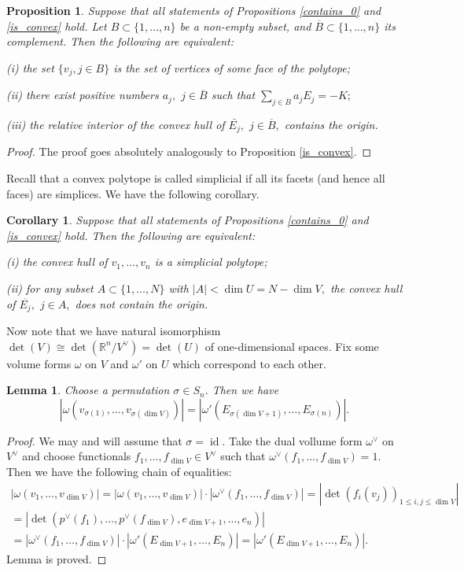 \documentclass[11pt,leqno]{amsart}
\newtheorem{lemma}[theo]{Lemma}
\newtheorem{prop}[theo]{Proposition}
\newtheorem{cor}[theo]{Corollary}
\numberwithin{equation}{section}
\def\R{\mathbb{R}}
\newcommand{\id}{\operatorname{id}}
\begin{document}
\begin{prop}\label{compl_to_faces}Suppose that all statements of Propositions \ref{contains_0} and \ref{is_convex} hold. Let $B\subset \{1,\dots,n\}$ be a non-empty subset, and $\overline{B}\subset \{1,\dots,n\}$
its complement. Then the following are equivalent:

(i) the set $\{v_j,j\in B\}$ is the set of vertices of some face of the polytope;

(ii) there exist positive numbers $a_j,$ $j\in\overline{B}$ such that
$\sum\limits_{j\in\overline{B}}a_jE_j=-K;$

(iii) the relative interior of the convex hull of $\bar{E_j},$ $j\in\overline{B},$ contains the origin.\end{prop}

\begin{proof}The proof goes absolutely analogously to Proposition \ref{is_convex}.\end{proof}

Recall that a convex polytope is called simplicial if all its facets (and hence all faces) are simplices. We have the following corollary.

\begin{cor}Suppose that all statements of Propositions \ref{contains_0} and \ref{is_convex} hold. Then the following are equivalent:

(i) the convex hull of $v_1,\dots,v_n$ is a simplicial polytope;

(ii) for any subset $A\subset \{1,\dots,N\}$ with $|A|<\dim U=N-\dim V,$ the convex hull of $\overline{E_j},$ $j\in A,$
does not contain the origin.\end{cor}

Now note that we have natural isomorphism $\det(V)\cong \det(\R^n/V^{\vee})=\det(U)$ of one-dimensional spaces. Fix some
volume forms $\omega$ on $V$ and $\omega'$ on $U$ which correspond to each other.

\begin{lemma}\label{volumes}Choose a permutation $\sigma\in S_n.$ Then we have
$$|\omega(v_{\sigma(1)},\dots,v_{\sigma(\dim V)})|=|\omega'(E_{\sigma(\dim V+1)},\dots,E_{\sigma(n)})|.$$\end{lemma}

\begin{proof}We may and will assume that $\sigma=\id.$ Take the dual vollume form $\omega^{\vee}$ on $V^{\vee}$ and choose functionals
$f_1,\dots,f_{\dim V}\in V^{\vee}$ such that $\omega^{\vee}(f_1,\dots,f_{\dim V})=1.$ Then we have the following chain of equalities:
\begin{multline*}|\omega(v_1,\dots,v_{\dim V})|=|\omega(v_1,\dots,v_{\dim V})|\cdot |\omega^{\vee}(f_1,\dots,f_{\dim V})|=
|\det(f_i(v_j))_{1\leq i,j\leq\dim V}|\\
=|\det(p^{\vee}(f_1),\dots,p^{\vee}(f_{\dim V}),e_{\dim V+1},\dots,e_n)|\\
=|\omega^{\vee}(f_1,\dots,f_{\dim V})|\cdot
|\omega'(E_{\dim V+1},\dots,E_n)|=|\omega'(E_{\dim V+1},\dots,E_n)|.\end{multline*}
Lemma is proved.\end{proof}
\end{document}
